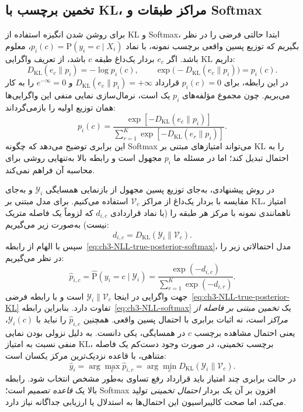 \subsection{تخمین برچسب با KL، مراکز طبقات و Softmax}
\label{subsec:ch3-NLL-definition}
برای روشن شدن انگیزه استفاده از KL و Softmax، ابتدا حالتی فرضی را در نظر بگیریم که توزیع پسین واقعی برچسب نمونه، با نماد $p_i(c)=\mathrm P(y_i=c\mid X_i)$، معلوم باشد. اگر $e_c$ بردار یک‌داغ طبقه $c$ باشد، از تعریف واگرایی KL داریم:
\begin{equation}\label{eq:ch3-NLL-true-posterior-KL}
D_{\mathrm{KL}}(e_c\|p_i)=-\log p_i(c),
\qquad
\exp\bigl(-D_{\mathrm{KL}}(e_c\|p_i)\bigr)=p_i(c).
\end{equation}
در این رابطه، برای $p_i(c)=0$ قرارداد $D_{\mathrm{KL}}(e_c\|p_i)=+\infty$ و $e^{-\infty}=0$ را به کار می‌بریم. چون مجموع مؤلفه‌های $p_i$ یک است، نرمال‌سازی نمایی منفی این واگرایی‌ها همان توزیع اولیه را بازمی‌گرداند:
\begin{equation}\label{eq:ch3-NLL-true-posterior-softmax}
p_i(c)=
\frac{\exp[-D_{\mathrm{KL}}(e_c\|p_i)]}
{\sum_{r=1}^{K}\exp[-D_{\mathrm{KL}}(e_r\|p_i)]}.
\end{equation}
این برابری توضیح می‌دهد که چگونه Softmax می‌تواند امتیازهای مبتنی بر KL را به احتمال تبدیل کند؛ اما در مسئله ما $p_i$ مجهول است و رابطه بالا به‌تنهایی روشی برای محاسبه آن فراهم نمی‌کند.

در روش پیشنهادی، به‌جای توزیع پسین مجهول از بازنمایی همسایگی $\mathscr Y_i$ و به‌جای مقایسه با بردار یک‌داغ از مراکز $\mathcal V_c$ استفاده می‌کنیم. برای مدل مبتنی بر KL، امتیاز ناهمانندی نمونه با مرکز هر طبقه را (با نماد قراردادی $d_{i,c}$ که لزوماً یک فاصله متریک نیست) به‌صورت زیر می‌گیریم:
\begin{equation}\label{eq:ch3-NLL-distance}
d_{i,c}=D_{\mathrm{KL}}(\mathscr Y_i\|\mathcal V_c).
\end{equation}
سپس با الهام از رابطه~\eqref{eq:ch3-NLL-true-posterior-softmax}، مدل احتمالاتی زیر را در نظر می‌گیریم:
\begin{equation}\label{eq:ch3-NLL-softmax}
\boxed{\widehat p_{i,c}
=\widehat{\mathrm P}(y_i=c\mid\mathscr Y_i)
=\frac{\exp(-d_{i,c})}{\sum_{r=1}^{K}\exp(-d_{i,r})}.}
\end{equation}
جهت واگرایی در اینجا $\mathscr Y_i\|\mathcal V_c$ است و با رابطه فرضی~\eqref{eq:ch3-NLL-true-posterior-KL} تفاوت دارد. بنابراین رابطه~\eqref{eq:ch3-NLL-softmax} یک \emph{تخمین مبتنی بر فاصله از مراکز} است، نه اثبات برابری با احتمال پسین واقعی. همچنین $\widehat p_{i,c}$ را نباید با $\mathscr Y_i(c)$، یعنی احتمال مشاهده برچسب $c$ در همسایگی، یکی دانست. به دلیل نزولی بودن نمایی منفی نسبت به امتیاز KL،
برچسب تخمینی، در صورت وجود دست‌کم یک
فاصله متناهی، با قاعده نزدیک‌ترین مرکز
یکسان است:
\begin{equation}\label{eq:ch3-estimated-label-from-neighborhood}
\boxed{
\widehat y_i
=\arg\max_{c}\widehat p_{i,c}
=\arg\min_{c}D_{\mathrm{KL}}(\mathscr Y_i\|\mathcal V_c).
}
\end{equation}
در حالت برابری چند امتیاز باید
قرارداد رفع تساوی به‌طور مشخص انتخاب شود.
رابطه بالا یک \emph{قاعده تصمیم} است؛
Softmax افزون بر آن یک بردار
\emph{احتمال تخمینی} تولید می‌کند،
اما صحت کالیبراسیون این احتمال‌ها
به استدلال یا ارزیابی جداگانه نیاز دارد.


